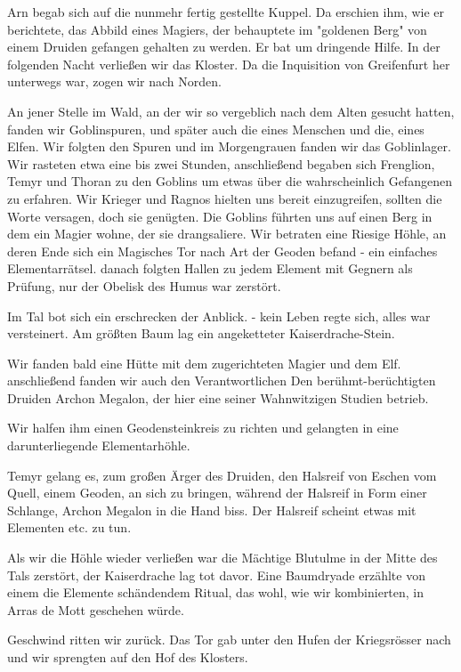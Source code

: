 Arn begab sich auf die nunmehr fertig gestellte Kuppel. Da erschien ihm, wie er berichtete, das Abbild eines Magiers, der behauptete im "goldenen Berg" von einem Druiden gefangen gehalten zu werden. Er bat um dringende Hilfe.
In der folgenden Nacht verließen wir das Kloster. Da die Inquisition von Greifenfurt her unterwegs war, zogen wir nach Norden.\par
An jener Stelle im Wald, an der wir so vergeblich nach dem Alten gesucht hatten, fanden wir Goblinspuren, und später auch die eines Menschen und die, eines Elfen. Wir folgten den Spuren und im Morgengrauen fanden wir das Goblinlager. Wir rasteten etwa eine bis zwei Stunden, anschließend begaben sich Frenglion, Temyr und Thoran zu den Goblins um etwas über die wahrscheinlich Gefangenen zu erfahren. Wir Krieger und Ragnos hielten uns bereit einzugreifen, sollten die Worte versagen, doch sie genügten. Die Goblins führten uns auf einen Berg in dem ein Magier wohne, der sie drangsaliere. Wir betraten eine Riesige Höhle, an deren Ende sich ein Magisches Tor nach Art der Geoden befand - ein einfaches Elementarrätsel. danach folgten Hallen zu jedem Element mit Gegnern als Prüfung, nur der Obelisk des Humus war zerstört.\par
Im Tal bot sich ein erschrecken der Anblick. - kein Leben regte sich, alles war versteinert. Am größten Baum lag ein angeketteter Kaiserdrache-Stein.\par
Wir fanden bald eine Hütte mit dem zugerichteten Magier und dem Elf. anschließend fanden wir auch den Verantwortlichen Den berühmt-berüchtigten Druiden Archon Megalon, der hier eine seiner Wahnwitzigen Studien betrieb.\par
Wir halfen ihm einen Geodensteinkreis zu richten und gelangten in eine darunterliegende Elementarhöhle.\par
Temyr gelang es, zum großen Ärger des Druiden, den Halsreif von Eschen vom Quell, einem Geoden, an sich zu bringen, während der Halsreif in Form einer Schlange, Archon Megalon in die Hand biss. Der Halsreif scheint etwas mit Elementen etc. zu tun.\par
Als wir die Höhle wieder verließen war die Mächtige Blutulme in der Mitte des Tals zerstört, der Kaiserdrache lag tot davor. Eine Baumdryade erzählte von einem die Elemente schändendem Ritual, das wohl, wie wir kombinierten, in Arras de Mott geschehen würde.\par
Geschwind ritten wir zurück. Das Tor gab unter den Hufen der Kriegsrösser nach und wir sprengten auf den Hof des Klosters.\par
